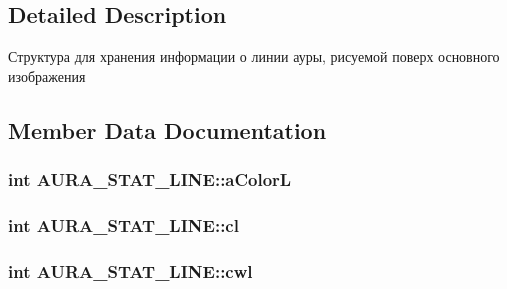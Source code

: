 \subsection{Detailed Description}
Структура для хранения информации о линии ауры, рисуемой поверх основного изображения 



\subsection{Member Data Documentation}
\hypertarget{class_a_u_r_a___s_t_a_t___l_i_n_e_abec39aa811f1c49d36f0c1595e5b7f70}{
\subsubsection[{a\+Color\+L}]{\setlength{\rightskip}{0pt plus 5cm}int A\+U\+R\+A\+\_\+\+S\+T\+A\+T\+\_\+\+L\+I\+N\+E\+::a\+Color\+L}}\label{class_a_u_r_a___s_t_a_t___l_i_n_e_abec39aa811f1c49d36f0c1595e5b7f70}




\hypertarget{class_a_u_r_a___s_t_a_t___l_i_n_e_af89b81c9dd28cf19cf058790ebf2c531}{
\subsubsection[{cl}]{\setlength{\rightskip}{0pt plus 5cm}int A\+U\+R\+A\+\_\+\+S\+T\+A\+T\+\_\+\+L\+I\+N\+E\+::cl}}\label{class_a_u_r_a___s_t_a_t___l_i_n_e_af89b81c9dd28cf19cf058790ebf2c531}




\hypertarget{class_a_u_r_a___s_t_a_t___l_i_n_e_a99860ef5a6830df0434e8a5b77375845}{
\subsubsection[{cwl}]{\setlength{\rightskip}{0pt plus 5cm}int A\+U\+R\+A\+\_\+\+S\+T\+A\+T\+\_\+\+L\+I\+N\+E\+::cwl}}\label{class_a_u_r_a___s_t_a_t___l_i_n_e_a99860ef5a6830df0434e8a5b77375845}




